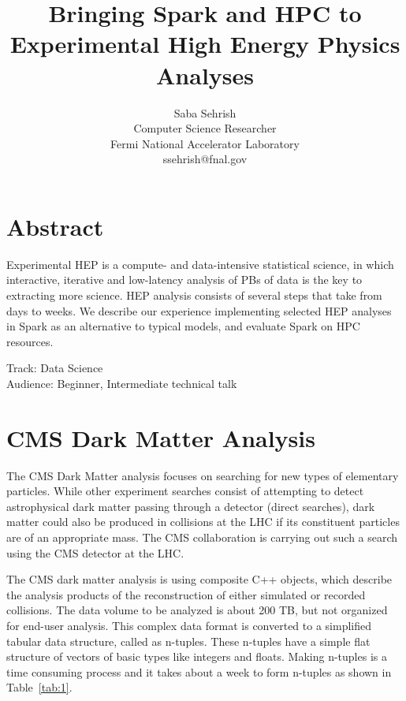 \documentclass[11pt, twocolumn]{article}
\newcommand{\squeezeup}{\vspace{-5.5mm}}
\begin{document}
\title{Bringing Spark and HPC to Experimental High Energy Physics Analyses}
\author{Saba Sehrish \\ Computer Science Researcher\\ Fermi National Accelerator Laboratory \\ ssehrish@fnal.gov}
\date{}
\maketitle

\thispagestyle{empty}

\section*{Abstract}
\squeezeup
Experimental HEP is a compute- and data-intensive statistical science, 
in which interactive, iterative and low-latency analysis of PBs of data is the key to extracting more science. HEP analysis consists of several steps that take from days to weeks. We describe our experience implementing selected HEP analyses in Spark as an alternative to typical models, and evaluate Spark on HPC resources.

Track: Data Science  \\
Audience: Beginner, Intermediate technical talk \\
\squeezeup

\section{CMS Dark Matter Analysis}
The CMS Dark Matter analysis focuses on searching for new types of 
elementary particles. 
While other experiment searches consist of attempting to detect astrophysical 
dark matter passing through a detector (direct searches), dark matter could 
also be produced in collisions at the LHC if its 
constituent particles are of an appropriate mass. The CMS collaboration is carrying out such a 
search using the CMS detector at the LHC. 

The CMS dark matter analysis is using composite C++ objects, 
which describe the analysis products of the reconstruction of either 
simulated or recorded collisions. 
The data volume to be analyzed is about 200 TB, but not organized for end-user analysis. 
This complex data format is converted to a simplified tabular data structure, called as n-tuples. 
These n-tuples have a simple flat structure of vectors of basic types like integers and floats. 
Making n-tuples is a time consuming process and it takes about a week to form n-tuples as 
shown in Table~\ref{tab:1}.   
\end{document}
